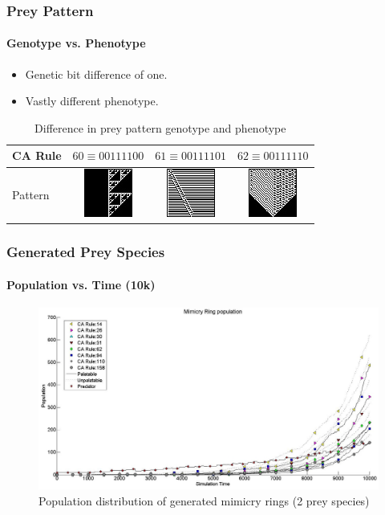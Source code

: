 \frame
{
	\frametitle{Prey Pattern}
	\framesubtitle{Genotype vs. Phenotype}
	
	\begin{itemize}
		\item Genetic bit difference of one.
		\item Vastly different phenotype.
	\end{itemize}
	
	\begin{table}
	\centering
	\begin{scriptsize}
	\begin{tabular}{|l|c|c|c|}
	  \hline
	  CA Rule & \(60 \equiv 00111100\) & \(61 \equiv 00111101\) & \(62 \equiv 00111110 \) \\ \hline
	  Pattern & \parbox[c]{2.1em}{\includegraphics[scale=0.40]{../tex/images/CARule60}} 
	  				& \parbox[c]{2.1em}{\includegraphics[scale=0.40]{../tex/images/CARule61}} 
	  				& \parbox[c]{2.1em}{\includegraphics[scale=0.40]{../tex/images/CARule62}}\\
	  \hline
	\end{tabular}
	\end{scriptsize}
	\caption{Difference in prey pattern genotype and phenotype}
	\label{tab:diff-in-pattern}
	\end{table}
}

\frame
{
	\frametitle{Generated Prey Species}
	\framesubtitle{Population vs. Time (10k)}
	
	\begin{figure}[H]
		\centering
		\includegraphics[scale=0.25]{../tex/images/simTime10k-2Prey-generated-prey}
		\caption{Population distribution of generated mimicry rings (2 prey species)}
		\label{fig:plot-2-prey-generated-prey}
	\end{figure}
}

